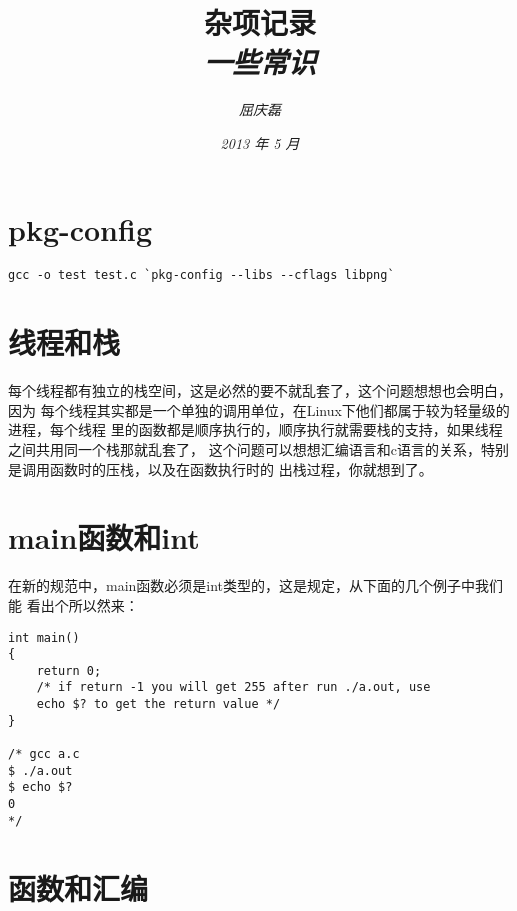\documentclass{article}
\begin{document}
\title{%
  {\huge \textsf{杂项记录}\\\smallskip}%
  {\small \textit{一些常识}}
}

\author{\textit{屈庆磊}\\[2mm]
       }

\date{\textit{2013 年 5 月}}

\maketitle
\newpage
\begin{multicols}{2}
\tableofcontents
\end{multicols}
\newpage 

\section{pkg-config}
\begin{verbatim}
gcc -o test test.c `pkg-config --libs --cflags libpng`
\end{verbatim}

\section{线程和栈}
每个线程都有独立的栈空间，这是必然的要不就乱套了，这个问题想想也会明白，因为
每个线程其实都是一个单独的调用单位，在Linux下他们都属于较为轻量级的进程，每个线程
里的函数都是顺序执行的，顺序执行就需要栈的支持，如果线程之间共用同一个栈那就乱套了，
这个问题可以想想汇编语言和c语言的关系，特别是调用函数时的压栈，以及在函数执行时的
出栈过程，你就想到了。

\section{main函数和int}
在新的规范中，main函数必须是int类型的，这是规定，从下面的几个例子中我们能
看出个所以然来：


\begin{verbatim}
int main()
{
	return 0;
	/* if return -1 you will get 255 after run ./a.out, use
	echo $? to get the return value */
}

/* gcc a.c
$ ./a.out
$ echo $?
0 
*/
\end{verbatim}

\section{函数和汇编}
\end{document}
